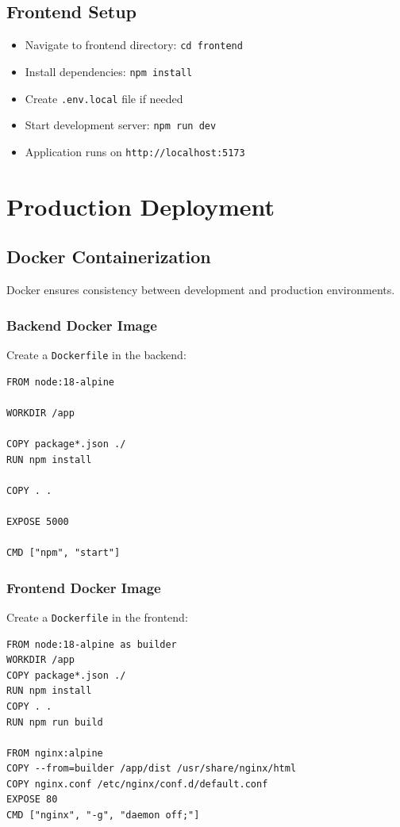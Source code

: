 \subsection{Frontend Setup}

\begin{itemize}
    \item Navigate to frontend directory: \texttt{cd frontend}
    \item Install dependencies: \texttt{npm install}
    \item Create \texttt{.env.local} file if needed
    \item Start development server: \texttt{npm run dev}
    \item Application runs on \texttt{http://localhost:5173}
\end{itemize}

\section{Production Deployment}

\subsection{Docker Containerization}

Docker ensures consistency between development and production environments.

\subsubsection{Backend Docker Image}

Create a \texttt{Dockerfile} in the backend:

\begin{verbatim}
FROM node:18-alpine

WORKDIR /app

COPY package*.json ./
RUN npm install

COPY . .

EXPOSE 5000

CMD ["npm", "start"]
\end{verbatim}

\subsubsection{Frontend Docker Image}

Create a \texttt{Dockerfile} in the frontend:

\begin{verbatim}
FROM node:18-alpine as builder
WORKDIR /app
COPY package*.json ./
RUN npm install
COPY . .
RUN npm run build

FROM nginx:alpine
COPY --from=builder /app/dist /usr/share/nginx/html
COPY nginx.conf /etc/nginx/conf.d/default.conf
EXPOSE 80
CMD ["nginx", "-g", "daemon off;"]
\end{verbatim}

